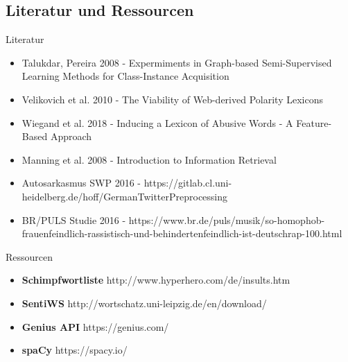 \documentclass{beamer}
\begin{document}
\subsection[Lit. + Res.]{Literatur und Ressourcen}


\begin{frame}{Literatur}
\begin{itemize}
\item Talukdar, Pereira 2008 - Expermiments in Graph-based Semi-Supervised Learning Methods for Class-Instance Acquisition
\item Velikovich et al. 2010 - The Viability of Web-derived Polarity Lexicons
\item Wiegand et al. 2018 - Inducing a Lexicon of Abusive Words - A Feature-Based Approach
\item Manning et al. 2008 - Introduction to Information Retrieval
\item Autosarkasmus SWP 2016 - https://gitlab.cl.uni-heidelberg.de/hoff/GermanTwitterPreprocessing
\item BR/PULS Studie 2016 - https://www.br.de/puls/musik/so-homophob-frauenfeindlich-rassistisch-und-behindertenfeindlich-ist-deutschrap-100.html
\end{itemize}
\end{frame}

\begin{frame}{Ressourcen}
\begin{itemize}
\item \textbf{Schimpfwortliste} http://www.hyperhero.com/de/insults.htm
\item \textbf{SentiWS} http://wortschatz.uni-leipzig.de/en/download/
\item \textbf{Genius API} https://genius.com/
\item \textbf{spaCy} https://spacy.io/
\end{itemize}
\end{frame}
\end{document}
